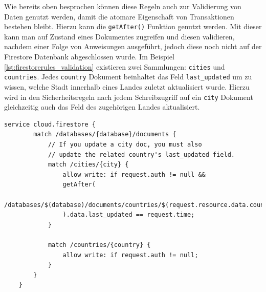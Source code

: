 \noindent
Wie bereits oben besprochen können diese Regeln auch zur Validierung von Daten genutzt werden, damit die atomare Eigenschaft von Transaktionen bestehen bleibt.
Hierzu kann die \texttt{getAfter()} Funktion genutzt werden. 
Mit dieser kann man auf Zustand eines Dokumentes zugreifen und diesen validieren, nachdem einer Folge von Anweisungen ausgeführt, jedoch diese noch nicht auf der Firestore Datenbank abgeschlossen wurde.
Im Beispiel \ref{lst:firestorerules_validation} existieren zwei Sammlungen: \texttt{cities} und \texttt{countries}. 
Jedes \texttt{country} Dokument beinhaltet das Feld \texttt{last\_updated} um zu wissen, welche Stadt innerhalb eines Landes zuletzt aktualisiert wurde.
Hierzu wird in den Sicherheitsregeln nach jedem Schreibzugriff auf ein \texttt{city} Dokument gleichzeitig auch das Feld des zugehörigen Landes aktualisiert.\cite{firebase2021}
\medskip
\begin{lstlisting}[caption=Datenvalidierung für atomare Operationen, label=lst:firestorerules_validation]
	service cloud.firestore {
		match /databases/{database}/documents {
			// If you update a city doc, you must also
			// update the related country's last_updated field.
			match /cities/{city} {
				allow write: if request.auth != null &&
				getAfter(
				/databases/$(database)/documents/countries/$(request.resource.data.country)
				).data.last_updated == request.time;
			}
			
			match /countries/{country} {
				allow write: if request.auth != null;
			}
		}
	}
\end{lstlisting}
\medskip

